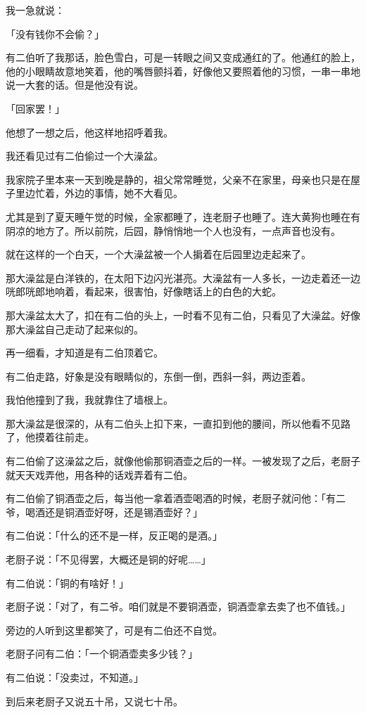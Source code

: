\documentclass[UTF8]{ctexart}
\begin{document}
我一急就说：

「没有钱你不会偷？」

有二伯听了我那话，脸色雪白，可是一转眼之间又变成通红的了。他通红的脸上，他的小眼睛故意地笑着，他的嘴唇颤抖着，好像他又要照着他的习惯，一串一串地说一大套的话。但是他没有说。

「回家罢！」

他想了一想之后，他这样地招呼着我。

我还看见过有二伯偷过一个大澡盆。

我家院子里本来一天到晚是静的，祖父常常睡觉，父亲不在家里，母亲也只是在屋子里边忙着，外边的事情，她不大看见。

尤其是到了夏天睡午觉的时候，全家都睡了，连老厨子也睡了。连大黄狗也睡在有阴凉的地方了。所以前院，后园，静悄悄地一个人也没有，一点声音也没有。

就在这样的一个白天，一个大澡盆被一个人掮着在后园里边走起来了。

那大澡盆是白洋铁的，在太阳下边闪光湛亮。大澡盆有一人多长，一边走着还一边咣郎咣郎地响着，看起来，很害怕，好像瞎话上的白色的大蛇。

那大澡盆太大了，扣在有二伯的头上，一时看不见有二伯，只看见了大澡盆。好像那大澡盆自己走动了起来似的。

再一细看，才知道是有二伯顶着它。

有二伯走路，好象是没有眼睛似的，东倒一倒，西斜一斜，两边歪着。

我怕他撞到了我，我就靠住了墙根上。

那大澡盆是很深的，从有二伯头上扣下来，一直扣到他的腰间，所以他看不见路了，他摸着往前走。

有二伯偷了这澡盆之后，就像他偷那铜酒壶之后的一样。一被发现了之后，老厨子就天天戏弄他，用各种的话戏弄着有二伯。

有二伯偷了铜酒壶之后，每当他一拿着酒壶喝酒的时候，老厨子就问他：「有二爷，喝酒还是铜酒壶好呀，还是锡酒壶好？」

有二伯说：「什么的还不是一样，反正喝的是酒。」

老厨子说：「不见得罢，大概还是铜的好呢……」

有二伯说：「铜的有啥好！」

老厨子说：「对了，有二爷。咱们就是不要铜酒壶，铜酒壶拿去卖了也不值钱。」

旁边的人听到这里都笑了，可是有二伯还不自觉。

老厨子问有二伯：「一个铜酒壶卖多少钱？」

有二伯说：「没卖过，不知道。」

到后来老厨子又说五十吊，又说七十吊。
\end{document}
